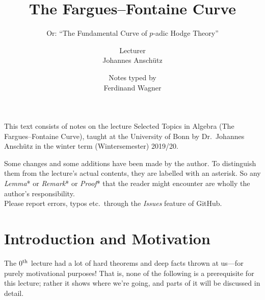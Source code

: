 \documentclass[a4paper, 10pt, oneside, DIV=9, chapterprefix=true, numbers=enddot,bibliography=totoc]{scrbook}
\title{The Fargues--Fontaine Curve}
\subtitle{Or: \enquote{The Fundamental Curve of $p$-adic Hodge Theory}}
\author{{\normalsize Lecturer}\\
	Johannes Anschütz}
\date{{\normalsize Notes typed by}\\
	Ferdinand Wagner}
\begin{document}
\frontmatter
{}
\maketitle
\noindent This text consists of notes on the lecture Selected Topics in Algebra (The Fargues--Fontaine Curve), taught at the University of
Bonn by Dr.\ Johannes Anschütz in the winter term (Wintersemester) 2019/20.

Some changes and some additions have been made by the author. To distinguish them from the lecture's actual contents, they are labelled with an asterisk. So any \emph{Lemma}* or \emph{Remark}* or \emph{Proof}* that the reader might encounter are wholly the author's responsibility.\\[\thmsep]Please report errors, typos etc.\ through the \emph{Issues} feature of GitHub.


\tableofcontents
{}
\setcounter{llecture}{-1}
\chapter{Introduction and Motivation}
\renewcommand{\thedummy}{\thechapter.\thesection.\arabic{dummy}}
The $0^{\text{th}}$ lecture had a lot of hard theorems and deep facts thrown at us---for purely motivational purposes! That is, none of the following is a prerequisite for this lecture; rather it shows where we're going, and parts of it will be discussed in detail.
\end{document}
